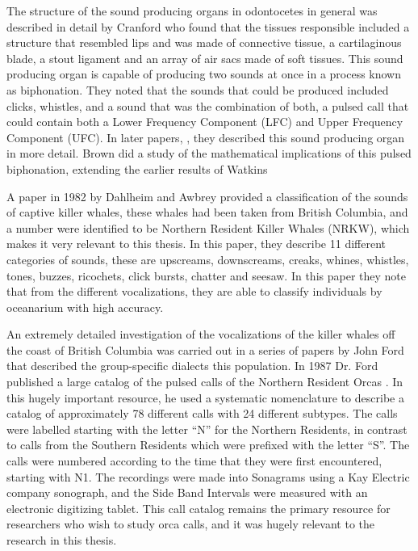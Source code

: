 \documentclass[12pt,oneside]{book}
\begin{document}
The structure of the sound producing organs in odontocetes in general
was described in detail by Cranford \cite{cranford96} who found that
the tissues responsible included a structure that resembled lips and
was made of connective tissue, a cartilaginous blade, a stout ligament
and an array of air sacs made of soft tissues.  This sound producing
organ is capable of producing two sounds at once in a process known as
biphonation.  They noted that the sounds that could be produced
included clicks, whistles, and a sound that was the combination of
both, a pulsed call that could contain both a Lower Frequency
Component (LFC) and Upper Frequency Component (UFC).  In later papers,
\cite{cranford00} \cite{cranford06}, they described this sound
producing organ in more detail.  Brown \cite{brown08} did a study of
the mathematical implications of this pulsed biphonation, extending
the earlier results of Watkins \cite{watkins67}

A paper in 1982 by Dahlheim and Awbrey \cite{dahlheim82} provided a
classification of the sounds of captive killer whales, these whales
had been taken from British Columbia, and a number were identified to
be Northern Resident Killer Whales (NRKW), which makes it very relevant to
this thesis.  In this paper, they describe 11 different categories of
sounds, these are upscreams, downscreams, creaks, whines, whistles,
tones, buzzes, ricochets, click bursts, chatter and seesaw.  In this
paper they note that from the different vocalizations, they are able
to classify individuals by oceanarium with high accuracy.  

An extremely detailed investigation of the vocalizations of the killer
whales off the coast of British Columbia was carried out in a series
of papers by John Ford \cite{ford82} \cite{ford83} that described
the group-specific dialects this population.  In 1987 Dr. Ford
published a large catalog of the pulsed calls of the Northern Resident
Orcas \cite{ford87}.  In this hugely important resource, he used a
systematic nomenclature to describe a catalog of approximately 78
different calls with 24 different subtypes.  The calls were labelled
starting with the letter ``N'' for the Northern Residents, in contrast
to calls from the Southern Residents which were prefixed with the
letter ``S''.  The calls were numbered according to the time that they
were first encountered, starting with N1.  The recordings were made
into Sonagrams using a Kay Electric company sonograph, and the Side
Band Intervals were measured with an electronic digitizing tablet.
This call catalog remains the primary resource for researchers who
wish to study orca calls, and it was hugely relevant to the research
in this thesis.
\end{document}
